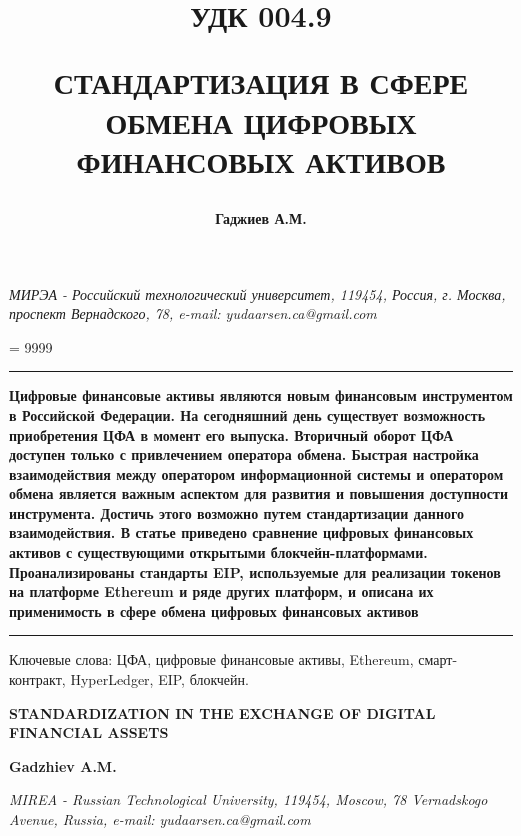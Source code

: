 \documentclass[a4paper, 10pt]{article}
\title{ 
	\begin{flushleft}
		\begin{spacing}{1.25}
		 	УДК 004.9
		\end{spacing}
	\end{flushleft}  
	\textbf{
			\fontsize{14pt}{0pt}\selectfont	СТАНДАРТИЗАЦИЯ В СФЕРЕ ОБМЕНА ЦИФРОВЫХ ФИНАНСОВЫХ АКТИВОВ
		}
	}
\author{\textbf{Гаджиев А.М.}}
\date{}
\begin{document}
	\maketitle
	\leftskip 0.5cm
	\begin{raggedleft}
	 \textit{МИРЭА - Российский технологический университет, 119454, Россия, г. Москва, проспект Вернадского, 78, e-mail: yudaarsen.ca@gmail.com
	 }
	\end{raggedleft}
	
	\justifying
	\tolerance = 9999
	\leftskip 0cm
	
	\vspace{3pt}
	\hrule height 2pt
	\vspace{3pt}
	
	\noindent \textbf{Цифровые финансовые активы являются новым финансовым инструментом в Российской Федерации. На сегодняшний день существует возможность приобретения ЦФА в момент его выпуска. Вторичный оборот ЦФА доступен только с привлечением оператора обмена. Быстрая настройка взаимодействия между оператором информационной системы и оператором обмена является важным аспектом для развития и повышения доступности инструмента. Достичь этого возможно путем стандартизации данного взаимодействия. В статье приведено сравнение цифровых финансовых активов с существующими открытыми блокчейн-платформами. Проанализированы стандарты EIP, используемые для реализации токенов на платформе Ethereum и ряде других платформ, и описана их применимость в сфере обмена цифровых финансовых активов}
	
	\vspace{3pt}
	\hrule height 2pt
	\vspace{6pt}
	
	\noindent Ключевые слова: ЦФА, цифровые финансовые активы, Ethereum, смарт-контракт, HyperLedger, EIP, блокчейн.
	
	\begin{center}
		\begin{spacing}{1.5}
			\textbf{\fontsize{14pt}{0}\selectfont STANDARDIZATION IN THE EXCHANGE OF DIGITAL FINANCIAL ASSETS}
		\end{spacing}
		\vspace{\baselineskip}
		\textbf{\fontsize{14pt}{0}\selectfont Gadzhiev A.M.}
	\end{center}
	
	\leftskip 0.5cm
	\begin{raggedleft}
		\textit{MIREA - Russian Technological University, 119454, Moscow, 78 Vernadskogo Avenue, Russia, e-mail: yudaarsen.ca@gmail.com}
	\end{raggedleft}
	
\end{document}
